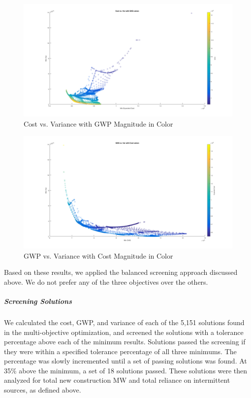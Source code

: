 \documentclass{article}
\begin{document}
		\begin{figure}
			\includegraphics[width=\textwidth]{435_14_costvar}
			\caption{Cost vs. Variance with GWP Magnitude in Color }
		\end{figure}
		
		\begin{figure}
			\includegraphics[width=\textwidth]{435_15_ghgvar}
			\caption{GWP vs. Variance with Cost Magnitude in Color}
		\end{figure}
		
		
		Based on these results, we applied the balanced screening approach discussed above. We do not prefer any of the three objectives over the others.
		
	\subparagraph{Screening Solutions}
		We calculated the cost, GWP, and variance of each of the 5,151 solutions found in the multi-objective optimization, and screened the solutions with a tolerance percentage above each of the minimum results. Solutions passed the screening if they were within a specified tolerance percentage of all three minimums. The percentage was slowly incremented until a set of passing solutions was found. At 35\% above the minimum, a set of 18 solutions passed. These solutions were then analyzed for total new construction MW and total reliance on intermittent sources, as defined above.
		
\end{document}
